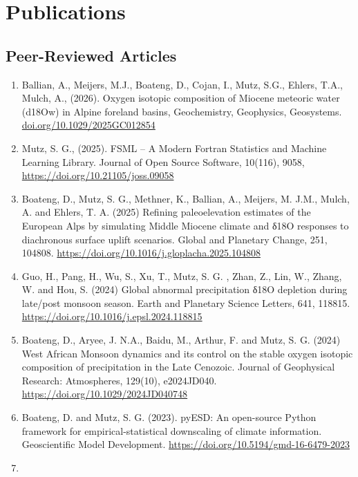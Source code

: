 \documentclass[
  letterpaper,
  DIV=11,
  numbers=noendperiod]{scrartcl}
\begin{document}
\section{\texorpdfstring{{ Publications
}}{ Publications }}\label{publications}

\subsection{Peer-Reviewed Articles}\label{peer-reviewed-articles}

\begin{enumerate}
\def\labelenumi{\arabic{enumi}.}
\item
  Ballian, A., Meijers, M.J., Boateng, D., Cojan, I., Mutz, S.G.,
  Ehlers, T.A., Mulch, A., (2026). Oxygen isotopic composition of
  Miocene meteoric water (d18Ow) in Alpine foreland basins,
  Geochemistry, Geophysics, Geosystems.
  \href{https://doi.org/10.1029/2025GC012854}{doi.org/10.1029/2025GC012854}
\item
  Mutz, S. G., (2025). FSML -- A Modern Fortran Statistics and Machine
  Learning Library. Journal of Open Source Software, 10(116), 9058,
  \url{https://doi.org/10.21105/joss.09058}
\item
  Boateng, D., Mutz, S. G., Methner, K., Ballian, A., Meijers, M. J.M.,
  Mulch, A. and Ehlers, T. A. (2025) Refining paleoelevation estimates
  of the European Alps by simulating Middle Miocene climate and δ18O
  responses to diachronous surface uplift scenarios. Global and
  Planetary Change, 251, 104808.
  \url{https://doi.org/10.1016/j.gloplacha.2025.104808}
\item
  Guo, H., Pang, H., Wu, S., Xu, T., Mutz, S. G. , Zhan, Z., Lin, W.,
  Zhang, W. and Hou, S. (2024) Global abnormal precipitation δ18O
  depletion during late/post monsoon season. Earth and Planetary Science
  Letters, 641, 118815. \url{https://doi.org/10.1016/j.epsl.2024.118815}
\item
  Boateng, D., Aryee, J. N.A., Baidu, M., Arthur, F. and Mutz, S. G.
  (2024) West African Monsoon dynamics and its control on the stable
  oxygen isotopic composition of precipitation in the Late Cenozoic.
  Journal of Geophysical Research: Atmospheres, 129(10), e2024JD040.
  \url{https://doi.org/10.1029/2024JD040748}
\item
  Boateng, D. and Mutz, S. G. (2023). pyESD: An open-source Python
  framework for empirical-statistical downscaling of climate
  information. Geoscientific Model Development.
  \url{https://doi.org/10.5194/gmd-16-6479-2023}
\item

\end{enumerate}
\end{document}
